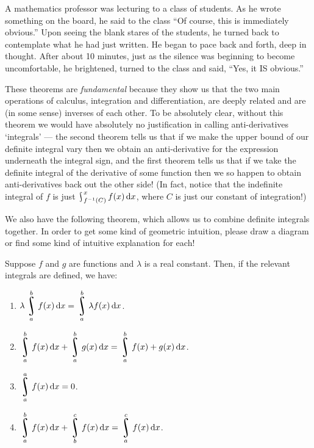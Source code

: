 \begin{joke}
  A mathematics professor was lecturing to a class of students. As he wrote something on the board,
  he said to the class ``Of course, this is immediately obvious.'' Upon seeing the blank stares of
  the students, he turned back to contemplate what he had just written. He began to pace back and
  forth, deep in thought. After about 10 minutes, just as the silence was beginning to become uncomfortable,
  he brightened, turned to the class and said, ``Yes, it IS obvious.''
\end{joke}

These theorems are \emph{fundamental} because they show us that the two main operations of calculus, integration and differentiation,
are deeply related and are (in some sense) inverses of each other. To be absolutely clear, without this theorem we would have absolutely
no justification in calling anti-derivatives `integrals' --- the second theorem tells us that if we make the upper bound of our definite integral
vary then we obtain an anti-derivative for the expression underneath the integral sign, and the first theorem tells us that if we take the definite
integral of the derivative of some function then we so happen to obtain anti-derivatives back out the other side! (In fact, notice that the indefinite
integral of $ f $ is just $ \rint^x_{f^{-1}(C)} f(x) \dif{x} $, where $ C $ is just our constant of integration!)

We also have the following theorem, which allows us to combine definite integrals together. In order to get some kind of geometric intuition,
please draw a diagram or find some kind of intuitive explanation for each!
\begin{thm}
  Suppose $ f $ and $ g $ are functions and $ \lambda $ is a real constant. Then, if the relevant integrals are defined, we have:
  \begin{enumerate}
    \item $ \displaystyle\lambda \rint_a^b f(x) \dif{x} = \rint_a^b \lambda f(x) \dif{x} $.
    \item $ \displaystyle\rint_a^b f(x) \dif{x} + \rint_a^b g(x) \dif{x} = \rint_a^b f(x) + g(x) \dif{x} $.
    \item $ \displaystyle\rint_a^a f(x) \dif{x} = 0 $.
    \item $ \displaystyle\rint_a^b f(x) \dif{x} + \rint_b^c f(x) \dif{x} = \rint_a^c f(x) \dif{x} $.
  \end{enumerate}
\end{thm}


